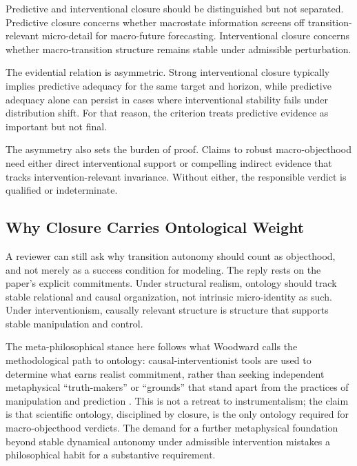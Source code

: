 Predictive and interventional closure should be distinguished but not
separated. Predictive closure concerns whether macrostate information
screens off transition-relevant micro-detail for macro-future
forecasting. Interventional closure concerns whether macro-transition
structure remains stable under admissible perturbation.

The evidential relation is asymmetric. Strong interventional closure
typically implies predictive adequacy for the same target and horizon,
while predictive adequacy alone can persist in cases where
interventional stability fails under distribution shift. For that reason,
the criterion treats predictive evidence as important but not final.

The asymmetry also sets the burden of proof. Claims to robust
macro-objecthood need either direct interventional support or compelling
indirect evidence that tracks intervention-relevant invariance. Without
either, the responsible verdict is qualified or indeterminate.

\subsection{Why Closure Carries Ontological
	Weight}\label{why-closure-carries-ontological-weight}

A reviewer can still ask why transition autonomy should count as
objecthood, and not merely as a success condition for modeling. The
reply rests on the paper's explicit commitments. Under structural
realism, ontology should track stable relational and causal
organization, not intrinsic micro-identity as such. Under
interventionism, causally relevant structure is structure that supports
stable manipulation and control.

The meta-philosophical stance here follows what Woodward calls the
methodological path to ontology: causal-interventionist tools are used
to determine what earns realist commitment, rather than seeking
independent metaphysical ``truth-makers'' or ``grounds'' that stand
apart from the practices of manipulation and prediction \citep{woodward2015}. This is not a retreat to instrumentalism; the claim is that
scientific ontology, disciplined by closure, is the only ontology
required for macro-objecthood verdicts. The demand for a further
metaphysical foundation beyond stable dynamical autonomy under
admissible intervention mistakes a philosophical habit for a substantive
requirement.


